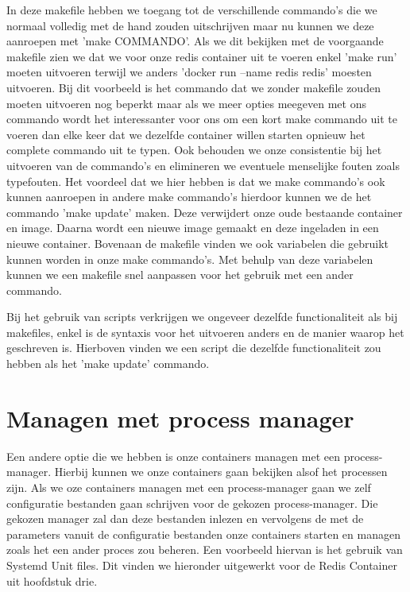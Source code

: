 In deze makefile hebben we toegang tot de verschillende commando's die we normaal volledig met de hand zouden uitschrijven maar nu kunnen we deze aanroepen met 'make COMMANDO'. Als we dit bekijken met de voorgaande makefile zien we dat we voor onze redis container uit te voeren enkel 'make run' moeten uitvoeren terwijl we anders 'docker run --name redis redis' moesten uitvoeren. Bij dit voorbeeld is het commando dat we zonder makefile zouden moeten uitvoeren nog beperkt maar als we meer opties meegeven met ons commando wordt het interessanter voor ons om een kort make commando uit te voeren dan elke keer dat we dezelfde container willen starten opnieuw het complete commando uit te typen. Ook behouden we onze consistentie bij het uitvoeren van de commando's en elimineren we eventuele menselijke fouten zoals typefouten. Het voordeel dat we hier hebben is dat we make commando's ook kunnen aanroepen in andere make commando's hierdoor kunnen we de het commando 'make update' maken. Deze verwijdert onze oude bestaande container en image. Daarna wordt een nieuwe image gemaakt en deze ingeladen in een nieuwe container. Bovenaan de makefile vinden we ook variabelen die gebruikt kunnen worden in onze make commando's. Met behulp van deze variabelen kunnen we een makefile snel aanpassen voor het gebruik met een ander commando.


Bij het gebruik van scripts verkrijgen we ongeveer dezelfde functionaliteit als bij makefiles, enkel is de syntaxis voor het uitvoeren anders en de manier waarop het geschreven is. Hierboven vinden we een script die dezelfde functionaliteit zou hebben als het 'make update' commando.



\section{Managen met process manager}

Een andere optie die we hebben is onze containers managen met een process-manager. Hierbij kunnen we onze containers gaan bekijken alsof het processen zijn. Als we oze containers managen met een process-manager gaan we zelf configuratie bestanden gaan schrijven voor de gekozen process-manager. Die gekozen manager zal dan deze bestanden inlezen en vervolgens de met de parameters vanuit de configuratie bestanden onze containers starten en managen zoals het een ander proces zou beheren. Een voorbeeld hiervan is het gebruik van Systemd Unit files. Dit vinden we hieronder uitgewerkt voor de Redis Container uit hoofdstuk drie.

